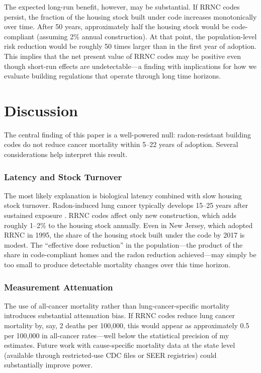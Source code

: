 \documentclass[12pt]{article}
\begin{document}
The expected long-run benefit, however, may be substantial. If RRNC codes persist, the fraction of the housing stock built under code increases monotonically over time. After 50 years, approximately half the housing stock would be code-compliant (assuming 2\% annual construction). At that point, the population-level risk reduction would be roughly 50 times larger than in the first year of adoption. This implies that the net present value of RRNC codes may be positive even though short-run effects are undetectable---a finding with implications for how we evaluate building regulations that operate through long time horizons.


\section{Discussion}

The central finding of this paper is a well-powered null: radon-resistant building codes do not reduce cancer mortality within 5--22 years of adoption. Several considerations help interpret this result.

\subsubsection*{Latency and Stock Turnover} The most likely explanation is biological latency combined with slow housing stock turnover. Radon-induced lung cancer typically develops 15--25 years after sustained exposure \citep{darby2005radon}. RRNC codes affect only new construction, which adds roughly 1--2\% to the housing stock annually. Even in New Jersey, which adopted RRNC in 1995, the share of the housing stock built under the code by 2017 is modest. The ``effective dose reduction'' in the population---the product of the share in code-compliant homes and the radon reduction achieved---may simply be too small to produce detectable mortality changes over this time horizon.

\subsubsection*{Measurement Attenuation} The use of all-cancer mortality rather than lung-cancer-specific mortality introduces substantial attenuation bias. If RRNC codes reduce lung cancer mortality by, say, 2 deaths per 100,000, this would appear as approximately 0.5 per 100,000 in all-cancer rates---well below the statistical precision of my estimates. Future work with cause-specific mortality data at the state level (available through restricted-use CDC files or SEER registries) could substantially improve power.
\end{document}
